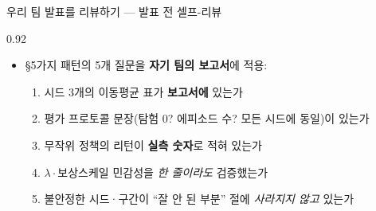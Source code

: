 \begin{frame}{우리 팀 발표를 리뷰하기 — 발표 전 셀프-리뷰}
\begin{center}\begin{varwidth}{0.92\textwidth}
  \begin{itemize}
    
    \item §5가지 패턴의 5개 질문을 \textbf{자기 팀의 보고서}에 적용:
      \begin{enumerate}
        \item 시드 3개의 이동평균 표가 \textbf{보고서에} 있는가
        \item 평가 프로토콜 문장(탐험 0? 에피소드 수? 모든 시드에 동일)이
          있는가
        \item 무작위 정책의 리턴이 \textbf{실측 숫자}로 적혀 있는가
        \item $\lambda\cdot$보상스케일 민감성을 \emph{한 줄이라도}
          검증했는가
        \item 불안정한 시드·구간이 ``잘 안 된 부분'' 절에 \emph{사라지지
          않고} 있는가
      \end{enumerate}
    
  \end{itemize}
\end{varwidth}\end{center}
\end{frame}
